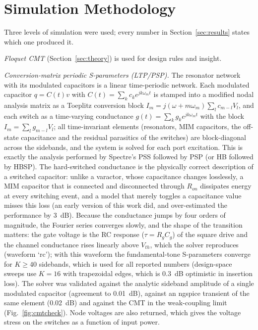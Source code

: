 \documentclass[journal]{IEEEtran}
\begin{document}
\section{Simulation Methodology}\label{sec:method}
Three levels of simulation were used; every number in Section~\ref{sec:results} states which one produced it.

\emph{Floquet CMT} (Section~\ref{sec:theory}) is used for design rules and insight.

\emph{Conversion-matrix periodic S-parameters (LTP/PSP).} The resonator network with its modulated capacitors is a linear time-periodic network. Each modulated capacitor $q=C(t)v$ with $C(t)=\sum_k c_k e^{jk\omega_m t}$ is stamped into a modified nodal analysis matrix as a Toeplitz conversion block $I_m=j(\omega+m\omega_m)\sum_l c_{m-l}V_l$, and each switch as a time-varying conductance $g(t)=\sum_k g_k e^{jk\omega_m t}$ with the block $I_m=\sum_l g_{m-l}V_l$; all time-invariant elements (resonators, MIM capacitors, the off-state capacitance and the residual parasitics of the switches) are block-diagonal across the sidebands, and the system is solved for each port excitation. This is exactly the analysis performed by Spectre's PSS followed by PSP (or HB followed by HBSP). The hard-switched conductance is the physically correct description of a switched capacitor: unlike a varactor, whose capacitance changes losslessly, a MIM capacitor that is connected and disconnected through $R_{on}$ dissipates energy at every switching event, and a model that merely toggles a capacitance value misses this loss (an early version of this work did, and over-estimated the performance by \SI{3}{dB}). Because the conductance jumps by four orders of magnitude, the Fourier series converges slowly, and the shape of the transition matters: the gate voltage is the RC response ($\tau=R_gC_g$) of the square drive and the channel conductance rises linearly above $V_{th}$, which the solver reproduces (waveform `rc'); with this waveform the fundamental-tone S-parameters converge for $K\ge40$ sidebands, which is used for all reported numbers (design-space sweeps use $K=16$ with trapezoidal edges, which is \SI{0.3}{dB} optimistic in insertion loss). The solver was validated against the analytic sideband amplitude of a single modulated capacitor (agreement to \SI{0.01}{dB}), against an ngspice transient of the same element (\SI{0.02}{dB}) and against the CMT in the weak-coupling limit (Fig.~\ref{fig:cmtcheck}). Node voltages are also returned, which gives the voltage stress on the switches as a function of input power.
\end{document}

